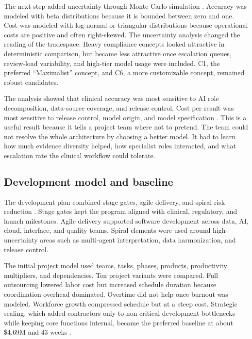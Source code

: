 The next step added uncertainty through Monte Carlo simulation \cite{sanguine_os14}. Accuracy was modeled with beta distributions because it is bounded between zero and one. Cost was modeled with log-normal or triangular distributions because operational costs are positive and often right-skewed. The uncertainty analysis changed the reading of the tradespace. Heavy compliance concepts looked attractive in deterministic comparison, but became less attractive once escalation queues, review-load variability, and high-tier model usage were included. C1, the preferred ``Maximalist'' concept, and C6, a more customizable concept, remained robust candidates.

The analysis showed that clinical accuracy was most sensitive to AI role decomposition, data-source coverage, and release control. Cost per result was most sensitive to release control, model origin, and model specification \cite{sanguine_os14}. This is a useful result because it tells a project team where not to pretend. The team could not resolve the whole architecture by choosing a better model. It had to learn how much evidence diversity helped, how specialist roles interacted, and what escalation rate the clinical workflow could tolerate.

\subsection{Development model and baseline}

The development plan combined stage gates, agile delivery, and spiral risk reduction \cite{sanguine_os15,sanguine_os16}. Stage gates kept the program aligned with clinical, regulatory, and launch milestones. Agile delivery supported software development across data, AI, cloud, interface, and quality teams. Spiral elements were used around high-uncertainty areas such as multi-agent interpretation, data harmonization, and release control.

The initial project model used teams, tasks, phases, products, productivity multipliers, and dependencies. Ten project variants were compared. Full outsourcing lowered labor cost but increased schedule duration because coordination overhead dominated. Overtime did not help once burnout was modeled. Workforce growth compressed schedule but at a steep cost. Strategic scaling, which added contractors only to non-critical development bottlenecks while keeping core functions internal, became the preferred baseline at about \$4.69M and 43 weeks \cite{sanguine_os16}.

